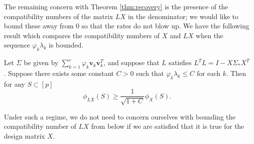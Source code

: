 \documentclass[11pt]{article}
\newcommand{\postCov}{\Sigma_*}
\begin{document}
The remaining concern with Theorem \ref{thm:recovery} is the presence of the compatibility numbers of the matrix $LX$ in the denominator; we would like to bound these away from 0 so that the rates do not blow up. We have the following result which compares the compatibility numbers of $X$ and $LX$ when the sequence $\varphi_k \lambda_k$ is bounded.
\begin{lemma}\label{lem:compatibility_relation}
	Let $\Sigma$ be given by $\sum_{k = 1}^r \varphi_k \mathbf{v}_k \mathbf{v}_k^T$, and suppose that $L$ satisfies $L^TL = I - X\postCov X^T$. Suppose there exists some constant $C > 0$ such that $\varphi_k \lambda_k \leq C$ for each $k$. Then for any $S \subset [p]$
	$$
	\phi_{LX}(S) \geq \frac{1}{\sqrt{1+C}} \phi_X(S).
	$$
\end{lemma}
Under such a regime, we do not need to concern ourselves with bounding the compatibility number of $LX$ from below if we are satisfied that it is true for the design matrix $X$. 
\end{document}
